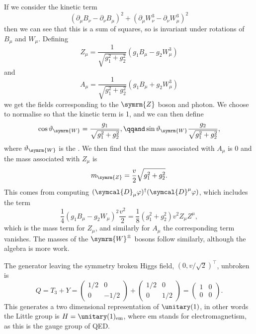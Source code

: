 \documentclass[fleqn]{NotesClass}
\newcommand{\Pparticle}[1]{\symrm{#1}}
\newcommand{\PWpm}{\ensuremath{\Pparticle{W}^{\pm}}}
\newcommand{\PZ}{\ensuremath{\Pparticle{Z}}}
\newcommand{\PW}{\ensuremath{\Pparticle{W}}}
\newcommand{\hermit}{\dagger}
\newcommand{\trans}{\top}
\newcommand{\covariantDerivative}{\symcal{D}}
\begin{document}
    If we consider the kinetic term
    \begin{equation}
        (\partial_\mu B_\nu - \partial_\nu B_\mu)^2 + (\partial_\mu W^3_\nu - \partial_\nu W^3_\mu)^2
    \end{equation}
    then we can see that this is a sum of squares, so is invariant under rotations of \(B_\mu\) and \(W_\mu\).
    Defining
    \begin{equation}
        Z_\mu = \frac{1}{\sqrt{g_1^2 + g_2^2}} (g_1 B_\mu - g_2 W^3_\mu)
    \end{equation}
    and
    \begin{equation}
        A_\mu = \frac{1}{\sqrt{g_1^2 + g_2^2}}(g_1 B_\mu + g_2 W^3_\mu)
    \end{equation}
    we get the fields corresponding to the \PZ{} boson and photon.
    We choose to normalise so that the kinetic term is 1, and we can then define
    \begin{equation}
        \cos\vartheta_{\PW} = \frac{g_1}{\sqrt{g_1^2 + g_2^2}}, \qqand \sin\vartheta_{\PW} \frac{g_2}{\sqrt{g_1^2 + g_2^2}},
    \end{equation}
    where \(\vartheta_{\PW}\) is the .
    We then find that the mass associated with \(A_\mu\) is 0 and the mass associated with \(Z_\mu\) is
    \begin{equation}
        m_{\PZ} = \frac{v}{2} \sqrt{g_1^2 + g_2^2}.
    \end{equation}
    This comes from computing \((\covariantDerivative_\mu \varphi)^\hermit (\covariantDerivative^\mu \varphi)\), which includes the term
    \begin{equation}
        \frac{1}{4}(g_1 B_\mu - g_2 W_\mu)^2 \frac{v^2}{2} = \frac{1}{8} (g_1^2 + g_2^2)v^2 Z_\mu Z^\mu,
    \end{equation}
    which is the mass term for \(Z_\mu\), and similarly for \(A_\mu\) the corresponding term vanishes.
    The masses of the \PWpm{} bosons follow similarly, although the algebra is more work.
    
    The generator leaving the symmetry broken Higgs field, \((0, v/\sqrt{2})^\trans\), unbroken is
    \begin{equation}
        Q = T_3 + Y = 
        \begin{pmatrix}
            1/2 & 0\\
            0 & -1/2
        \end{pmatrix}
        +
        \begin{pmatrix}
            1/2 & 0\\
            0 & 1/2
        \end{pmatrix}
        =
        \begin{pmatrix}
            1 & 0\\
            0 & 0
        \end{pmatrix}
        .
    \end{equation}
    This generates a two dimensional representation of \(\unitary(1)\), in other words the Little group is \(H = \unitary(1)_{\mathrm{em}}\), where \(\mathrm{em}\) stands for electromagnetism, as this is the gauge group of QED.
    
\end{document}
